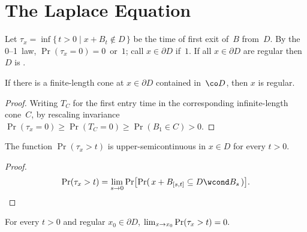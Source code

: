 \section	{The Laplace Equation}

\begin	{definition}
Let \( \tau_x = \inf\{\, t>0 \mid x+B_t \notin D \,\} \)
be the time of first exit of~$B$ from~$D$.
By the 0--1~law, \( \Pr(\tau_x = 0) = 0 \)~or~$1$;
call \( x \in \partial D \)  if~$1$.
If all \( x \in \partial D \) are regular then $D$ is .
\end	{definition}

\begin	{theorem}
If there is a finite-length cone at \( x \in \partial D \)
contained in~$\co D$,
then $x$ is regular.
\end	{theorem}
\begin	{proof}
Writing $T_C$ for the first entry time
in the corresponding infinite-length cone~$C$,
by rescaling invariance
\( \Pr(\tau_x=0) \ge \Pr(T_C=0) \ge \Pr(B_1 \in C) > 0 \).
\end	{proof}

\begin	{lemma}
The function \( \Pr(\tau_x > t) \) is upper-semicontinuous in \( x \in D \)
for every \( t > 0 \).
\end	{lemma}
\begin	{proof}
\begin	{equation*}
\Pr(\tau_x > t)
=	\lim_{s\to0}
	\Pr\bigl[ \Pr(\, x+B_{[s,t]} \subseteq D \wcond B_s \,) \bigr]
\text. \qedhere
\end	{equation*}
\end	{proof}

\begin	{corollary}
For every \( t > 0 \) and regular \( x_0 \in \partial D \),
\( \lim_{x \to x_0} \Pr(\tau_x > t) = 0 \text. \)
\end	{corollary}

